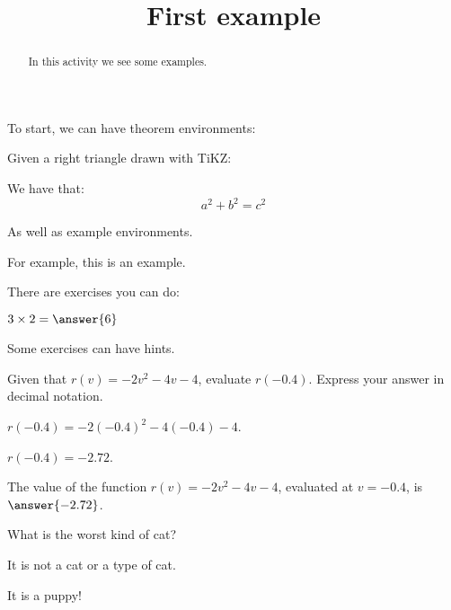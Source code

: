 \documentclass{ximera}
\title{First example}
\begin{document}
\begin{abstract}
In this activity we see some examples.
\end{abstract}
\maketitle

To start, we can have theorem environments:

\begin{theorem}
Given a right triangle drawn with TiKZ:
\begin{image}
\end{image}
We have that:
\[
a^2 + b^2 = c^2
\]
\end{theorem}


As well as example environments.

\begin{example}
For example, this is an example.
\end{example}


There are exercises you can do:

\begin{exercise}
$3\times 2=\answer{6}$
\end{exercise}

Some exercises can have hints.

\begin{exercise}
Given that $r(v)=-2 v^2-4 v-4$, evaluate $r(-0.4)$. Express your answer in decimal notation.
%
\begin{hint}
$r(-0.4)=-2 (-0.4)^2-4 (-0.4)-4$.
\end{hint}
\begin{hint}
$r(-0.4)=-2.72$.
\end{hint}

The value of the function $r(v)=-2 v^2-4 v-4$, evaluated at $v=-0.4$, is $\answer{-2.72}$.
%
\end{exercise}



\begin{question}
What is the worst kind of cat?
\begin{prompt}
\begin{multipleChoice}
\end{multipleChoice}
\end{prompt}
\begin{hint}
It is not a cat or a type of cat.
\end{hint}
\begin{hint}
It is a puppy!
\end{hint}
\end{question}
\end{document}
